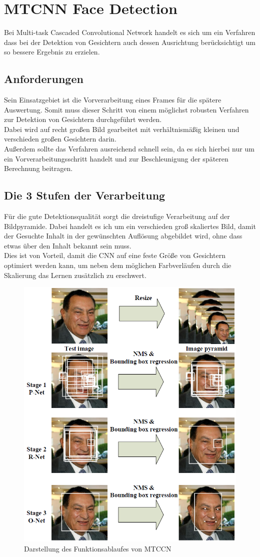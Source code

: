\section{MTCNN Face Detection}
\label{MTCNN}
Bei Multi-task Cascaded Convolutional Network handelt es sich um ein Verfahren dass bei der Detektion von Gesichtern auch dessen Ausrichtung berücksichtigt um so bessere Ergebnis zu erzielen.
\subsection{Anforderungen}
Sein Einsatzgebiet ist die Vorverarbeitung eines Frames für die spätere Auswertung. Somit muss dieser Schritt von einem möglichst robusten Verfahren zur Detektion von Gesichtern durchgeführt werden.\\
Dabei wird auf recht großen Bild gearbeitet mit verhältnismäßig kleinen und verschieden großen Gesichtern darin.\\
Außerdem sollte das Verfahren ausreichend schnell sein, da es sich hierbei nur um ein Vorverarbeitungsschritt handelt und zur Beschleunigung der späteren Berechnung beitragen.
\subsection{Die 3 Stufen der Verarbeitung}
Für die gute Detektionsqualität sorgt die dreistufige Verarbeitung auf der Bildpyramide. Dabei handelt es ich um ein verschieden groß skaliertes Bild, damit der Gesuchte Inhalt in der gewünschten Auflösung abgebildet wird, ohne dass etwas über den Inhalt bekannt sein muss.\\
Dies ist von Vorteil, damit die CNN auf eine feste Größe von Gesichtern optimiert werden kann, um neben dem möglichen Farbverläufen durch die Skalierung das Lernen zusätzlich zu erschwert.
\begin{figure}
	\centering
	\includegraphics[width=0.5\linewidth]{img/MTCNN_Step}
	\caption{Darstellung des Funktionsablaufes von MTCCN\cite{MTCCN}}
	\label{img_MTCNN_Step}
\end{figure}
